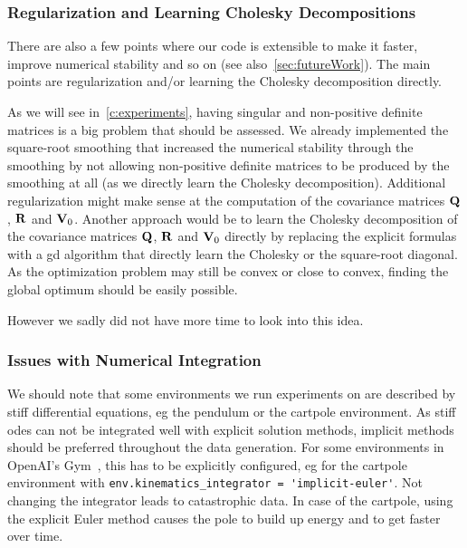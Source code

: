 
		\subsubsection{Regularization and Learning Cholesky Decompositions}
			There are also a few points where our code is extensible to make it faster, improve numerical stability and so on (see also~\autoref{sec:futureWork}). The main points are regularization and/or learning the Cholesky decomposition directly.

			As we will see in~\autoref{c:experiments}, having singular and non-positive definite matrices is a big problem that should be assessed. We already implemented the square-root smoothing that increased the numerical stability through the smoothing by not allowing non-positive definite matrices to be produced by the smoothing at all (as we directly learn the Cholesky decomposition). Additional regularization might make sense at the computation of the covariance matrices \(\boldsymbol{\mathrm{Q}}\), \(\boldsymbol{\mathrm{R}}\) and \(\boldsymbol{\mathrm{V}}_0\). Another approach would be to learn the Cholesky decomposition of the covariance matrices \(\boldsymbol{\mathrm{Q}}\), \(\boldsymbol{\mathrm{R}}\) and \(\boldsymbol{\mathrm{V}}_0\) directly by replacing the explicit formulas with a \ac{gd} algorithm that directly learn the Cholesky or the square-root diagonal. As the optimization problem may still be convex or close to convex, finding the global optimum should be easily possible.

			However we sadly did not have more time to look into this idea.

		\subsubsection{Issues with Numerical Integration}
			\label{subsubsec:integrationProblems}

			We should note that some environments we run experiments on are described by stiff differential equations, \ac{eg} the pendulum or the cartpole environment. As stiff \acp{ode} can not be integrated well with explicit solution methods, implicit methods should be preferred throughout the data generation. For some environments in OpenAI's Gym~\cite{brockmanOpenAIGym2016}, this has to be explicitly configured, \ac{eg} for the cartpole environment with \lstinline|env.kinematics_integrator = 'implicit-euler'|. Not changing the integrator leads to catastrophic data. In case of the cartpole, using the explicit Euler method causes the pole to build up energy and to get faster over time.

